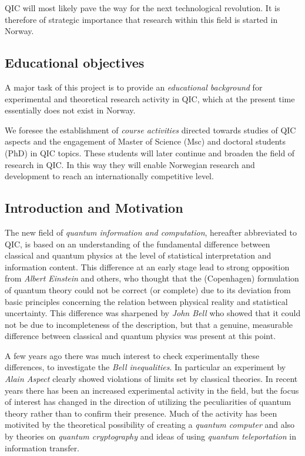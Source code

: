 QIC will most likely pave the way for the next technological
revolution. It is therefore of strategic importance
that research within this field is started in Norway.

\subsection{Educational objectives}

A major task of this project is to  provide an {\sl educational background}
for experimental and theoretical research activity in QIC,  which at
the present time essentially does not exist in Norway.

We foresee the establishment of {\sl course activities} directed towards
studies of QIC aspects and the engagement of Master of Science (Msc) and
doctoral students (PhD) in QIC topics.
These students will 
later
continue and broaden the field of
research in QIC. 
In this way they will 
enable Norwegian research and development to reach an
internationally competitive level.


\subsection{Introduction and Motivation}

The new field of {\em quantum information and computation},
hereafter abbreviated to QIC,  is based on an
understanding of the fundamental difference between classical and quantum
physics at the level of statistical interpretation and information
content. This difference at an early stage lead to strong opposition from
{\em Albert Einstein} and others, who thought that the (Copenhagen)
formulation of quantum theory could not be correct (or complete) due to
its deviation from basic principles concerning the relation between
physical reality and statistical uncertainty. This difference was
sharpened by {\em John Bell} who showed that it could not be due to
incompleteness of the description, but that a genuine, measurable
difference between classical and quantum physics was present at this
point.

A few years ago there was much interest to check experimentally these
differences, to investigate the {\em Bell inequalities}. In
particular an experiment by {\em Alain Aspect} clearly showed violations
of limits set by classical theories. In recent years there has been an
increased experimental activity in the field, but the focus of interest
has changed in the direction of utilizing the peculiarities of quantum
theory rather than to confirm their presence. Much of the activity
has been motivited by the theoretical possibility of creating a {\em
quantum computer} and also by theories on {\em quantum cryptography} and
ideas of using {\em quantum teleportation} in information transfer.


